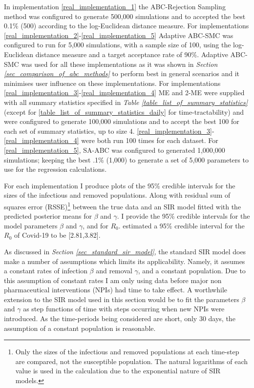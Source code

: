 \documentclass[11pt,a4paper]{article}
\theoremstyle{break}
\begin{document}
  \noindent In implementation \ref{real_implementation_1} the ABC-Rejection Sampling method was configured to generate 500,000 simulations and to accepted the best 0.1\% (500) according to the log-Euclidean distance measure. For implementations \ref{real_implementation_2}-\ref{real_implementation_5} Adaptive ABC-SMC was configured to run for 5,000 simulations, with a sample size of 100, using the log-Euclidean distance measure and a target acceptance rate of 90\%. Adaptive ABC-SMC was used for all these implementations as it was shown in \textit{Section \ref{sec_comparison_of_abc_methods}} to perform best in general scenarios and it minimises user influence on these implementations. For implementations \ref{real_implementation_3}-\ref{real_implementation_4} ME and 2-ME were supplied with all summary statistics specified in \textit{Table \ref{table_list_of_summary_statistics}} (except for \ref{table_list_of_summary_statistics_daily} for time-tractability) and were configured to generate 100,000 simulations and to accept the best 100 for each set of summary statistics, up to size 4.  \ref{real_implementation_3}-\ref{real_implementation_4} were both run 100 times for each dataset. For \ref{real_implementation_5}, SA-ABC was configured to generated 1,000,000 simulations; keeping the best .1\% (1,000) to generate a set of 5,000 parameters to use for the regression calculations.

  \par For each implementation I produce plots of the 95\% credible intervals for the sizes of the infectious and removed populations. Along with residual sum of squares error (RSSE)\footnote{Only the sizes of the infectious and removed populations at each time-step are compared, not the susceptible population. The natural logarithms of each value is used in the calculation due to the exponential nature of SIR models.} between the true data and an SIR model fitted with the predicted posterior means for $\beta$ and $\gamma$. I provide the 95\% credible intervals for the model parameters $\beta$ and $\gamma$, and for $R_0$. \cite[]{estimated_r0_covid_19} estimated a 95\% credible interval for the $R_0$ of Covid-19 to be [2.81,3.82].

  \par As discussed in \textit{Section \ref{sec_standard_sir_model}}, the standard SIR model does make a number of assumptions which limits its applicability. Namely, it assumes a constant rates of infection $\beta$ and removal $\gamma$, and a constant population. Due to this assumption of constant rates I am only using data before major non pharmaceutical interventions (NPIs) had time to take effect. A worthwhile extension to the SIR model used in this section would be to fit the parameters $\beta$ and $\gamma$ as step functions of time with steps occurring when new NPIs were introduced. As the time-periods being considered are short, only 30 days, the assumption of a constant population is reasonable.
\end{document}
